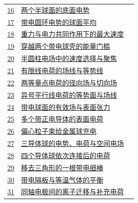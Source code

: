 \documentclass[UTF8,fontset=fandol,a4paper,11pt]{ctexart}
\begin{document}
\begin{longtable}{@{}r p{113mm} r@{}}
\hyperref[q:16]{16} & \hyperref[q:16]{两个半球面的底面电势} & \pageref{q:16} \\

\hyperref[q:17]{17} & \hyperref[q:17]{带电圆环电势的球面平均} & \pageref{q:17} \\

\hyperref[q:18]{18} & \hyperref[q:18]{重力与电力共同作用下的最大速度} & \pageref{q:18} \\

\hyperref[q:19]{19} & \hyperref[q:19]{穿越两个带电球壳的能量门槛} & \pageref{q:19} \\

\hyperref[q:20]{20} & \hyperref[q:20]{半圆柱电场中的速度选择与聚焦} & \pageref{q:20} \\

\hyperref[q:21]{21} & \hyperref[q:21]{有限线电荷的场线与等势线} & \pageref{q:21} \\

\hyperref[q:22]{22} & \hyperref[q:22]{两等量点电荷的径向场与切向场} & \pageref{q:22} \\

\hyperref[q:23]{23} & \hyperref[q:23]{异号平行线电荷的等势面与场线} & \pageref{q:23} \\

\hyperref[q:24]{24} & \hyperref[q:24]{带电球面的有效场与表面张力} & \pageref{q:24} \\

\hyperref[q:25]{25} & \hyperref[q:25]{多个带正电导体的表面电荷} & \pageref{q:25} \\

\hyperref[q:26]{26} & \hyperref[q:26]{偏心粒子束给金属球充电} & \pageref{q:26} \\

\hyperref[q:27]{27} & \hyperref[q:27]{三导体球的电势、电荷与空间电场} & \pageref{q:27} \\

\hyperref[q:28]{28} & \hyperref[q:28]{四个导体球依次连接后的电荷} & \pageref{q:28} \\

\hyperref[q:29]{29} & \hyperref[q:29]{移去三角形的一根带电细棒} & \pageref{q:29} \\

\hyperref[q:30]{30} & \hyperref[q:30]{带电隔板与等温气体的平衡} & \pageref{q:30} \\

\hyperref[q:31]{31} & \hyperref[q:31]{同轴电极间的离子迁移与补充电荷} & \pageref{q:31} \\


\end{longtable}
\end{document}
